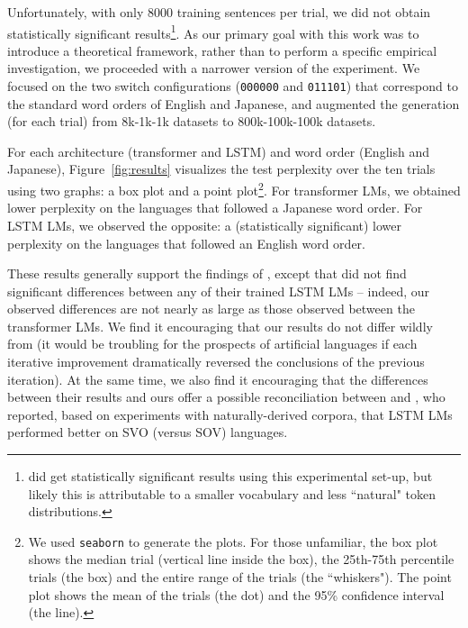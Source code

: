\documentclass[11pt,a4paper]{article}
\begin{document}
Unfortunately, with only 8000 training sentences per trial, we did not obtain statistically significant results\footnote{\citet{white-cotterell-2021-examining} did get statistically significant results using this experimental set-up, but likely this is attributable to a smaller vocabulary and less ``natural" token distributions.}. As our primary goal with this work was to introduce a theoretical framework, rather than to perform a specific empirical investigation, we proceeded with a narrower version of the \citet{white-cotterell-2021-examining} experiment. We focused on the two switch configurations (\texttt{000000} and \texttt{011101}) that correspond to the standard word orders of English and Japanese, and augmented the generation (for each trial) from 8k-1k-1k datasets to 800k-100k-100k datasets. 


For each architecture (transformer and LSTM) and word order (English and Japanese), Figure~\ref{fig:results} visualizes the test perplexity over the ten trials using two graphs: a box plot and a point plot\footnote{We used \texttt{seaborn} to generate the plots. For those unfamiliar, the box plot shows the median trial (vertical line inside the box), the 25th-75th percentile trials (the box) and the entire range of the trials (the ``whiskers"). The point plot shows the mean of the trials (the dot) and the 95\% confidence interval (the line).}. For transformer LMs, we obtained lower perplexity on the languages that followed a Japanese word order. For LSTM LMs, we observed the opposite: a (statistically significant) lower perplexity on the languages that followed an English word order.

These results generally support the findings of \citet{white-cotterell-2021-examining}, except that \citet{white-cotterell-2021-examining} did not find significant differences between any of their trained LSTM LMs -- indeed, our observed differences are not nearly as large as those observed between the transformer LMs. We find it encouraging that our results do not differ wildly from \citet{white-cotterell-2021-examining} (it would be troubling for the prospects of artificial languages if each iterative improvement dramatically reversed the conclusions of the previous iteration). At the same time, we also find it encouraging that the differences between their results and ours offer a possible reconciliation between \citet{white-cotterell-2021-examining} and \citet{ravfogel-etal-2019-studying}, who reported, based on experiments with naturally-derived corpora, that LSTM LMs performed better on SVO (versus SOV) languages.
\end{document}
